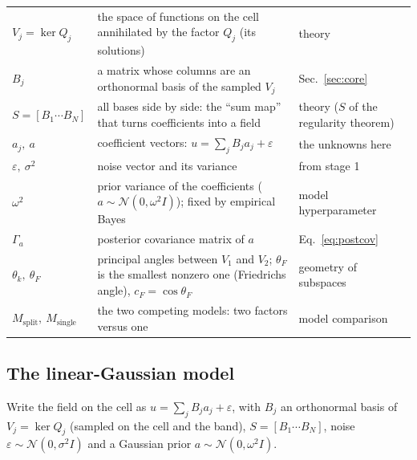 \documentclass[11pt,a4paper]{article}
\theoremstyle{definition}
\begin{document}
\begin{symbols}
\begin{tabular}{@{}L{2.6cm}L{6.0cm}L{4.3cm}@{}}
$V_j=\ker Q_j$ & the space of functions on the cell annihilated by the factor $Q_j$ (its solutions) & theory\\
$B_j$ & a matrix whose columns are an orthonormal basis of the sampled $V_j$ & Sec.~\ref{sec:core}\\
$S=[B_1\cdots B_N]$ & all bases side by side: the ``sum map'' that turns coefficients into a field & theory ($S$ of the regularity theorem)\\
$a_j,\ a$ & coefficient vectors: $u=\sum_jB_ja_j+\varepsilon$ & the unknowns here\\
$\varepsilon,\ \sigma^2$ & noise vector and its variance & from stage 1\\
$\omega^2$ & prior variance of the coefficients ($a\sim\mathcal N(0,\omega^2I)$); fixed by empirical Bayes & model hyperparameter\\
$\Gamma_a$ & posterior covariance matrix of $a$ & Eq.~\eqref{eq:postcov}\\
$\theta_k,\ \theta_F$ & principal angles between $V_1$ and $V_2$; $\theta_F$ is the smallest nonzero one (Friedrichs angle), $c_F=\cos\theta_F$ & geometry of subspaces\\
$M_{\mathrm{split}},\ M_{\mathrm{single}}$ & the two competing models: two factors versus one & model comparison\\
\end{tabular}
\end{symbols}

\subsection{The linear-Gaussian model}
Write the field on the cell as $u=\sum_jB_ja_j+\varepsilon$, with $B_j$ an orthonormal basis of $V_j=\ker Q_j$ (sampled on the cell and the band), $S=[B_1\cdots B_N]$, noise $\varepsilon\sim\mathcal N(0,\sigma^2I)$ and a Gaussian prior $a\sim\mathcal N(0,\omega^2I)$.
\end{document}
